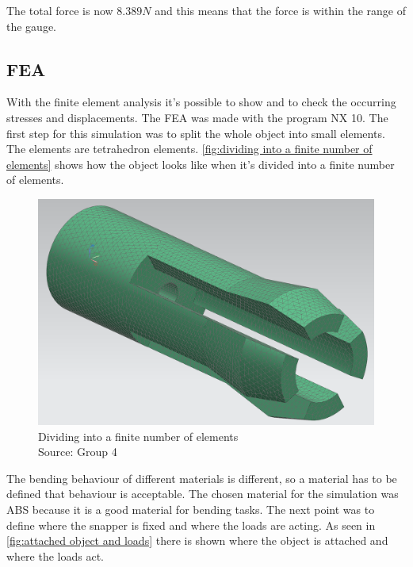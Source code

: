 \documentclass[a4paper,12pt]{scrreprt}
\begin{document}
The total force is now $8.389N$ and this means that the force is within the range of the gauge.

\subsection{\acs{FEA}}

With the finite element analysis it's possible to show and to check the occurring stresses and displacements. The \acs{FEA} was made with the program NX 10. The first step for this simulation was to split the whole object into small elements. The elements are tetrahedron elements. \autoref{fig:dividing into a finite number of elements} shows how the object looks like when it's divided into a finite number of elements.

 \begin{figure}[H]
  \centering
   \includegraphics[width=1\textwidth]{pictures/FEA1}
   \caption[Dividing into a finite number of elements]{Dividing into a finite number of elements\\
	Source: Group 4  
  }
   \label{fig:dividing into a finite number of elements}
\end{figure} 

The bending behaviour of different materials is different, so a material has to be defined that behaviour is acceptable. The chosen material for the simulation was ABS because it is a good material for bending tasks. The next point was to define where the snapper is fixed and where the loads are acting. As seen in \autoref{fig:attached object  and loads} there is shown where the object is attached and where the loads act.
\end{document}
